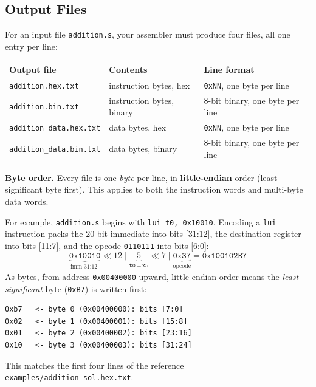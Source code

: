 \documentclass[11pt]{article}
\begin{document}
\subsection{Output Files}
\label{sec:outputs}
For an input file \texttt{addition.s}, your assembler must produce four
files, all one entry per line:

\begin{center}
\begin{tabular}{@{}p{4.3cm}p{4.6cm}p{5cm}@{}}
\toprule
\textbf{Output file} & \textbf{Contents} & \textbf{Line format} \\
\midrule
\texttt{addition.hex.txt}      & instruction bytes, hex   & \texttt{0xNN}, one byte per line \\
\texttt{addition.bin.txt}      & instruction bytes, binary & 8-bit binary, one byte per line \\
\texttt{addition\_data.hex.txt} & data bytes, hex          & \texttt{0xNN}, one byte per line \\
\texttt{addition\_data.bin.txt} & data bytes, binary       & 8-bit binary, one byte per line \\
\bottomrule
\end{tabular}
\end{center}


\begin{example}
\textbf{Byte order.} Every file is one \emph{byte} per line, in
\textbf{little-endian} order (least-significant byte first). This applies
to both the instruction words and multi-byte data words.

For example, \texttt{addition.s} begins with \texttt{lui t0, 0x10010}. Encoding a
\texttt{lui} instruction packs the 20-bit immediate into bits [31:12], the
destination register into bits [11:7], and the opcode \texttt{0110111}
into bits [6:0]:
\[
\underbrace{\texttt{0x10010}}_{\text{imm[31:12]}} \ll 12
\;\big|\;
\underbrace{5}_{\texttt{t0}\,=\,\texttt{x5}} \ll 7
\;\big|\;
\underbrace{\texttt{0x37}}_{\text{opcode}}
= \texttt{0x100102B7}
\]
As bytes, from address \texttt{0x00400000} upward, little-endian order
means the \emph{least significant} byte (\texttt{0xB7}) is written first:
\begin{lstlisting}[language={}]
0xb7   <- byte 0 (0x00400000): bits [7:0]
0x02   <- byte 1 (0x00400001): bits [15:8]
0x01   <- byte 2 (0x00400002): bits [23:16]
0x10   <- byte 3 (0x00400003): bits [31:24]
\end{lstlisting}
This matches the first four lines of the reference
\texttt{examples/addition\_sol.hex.txt}.
\end{example}
\end{document}

